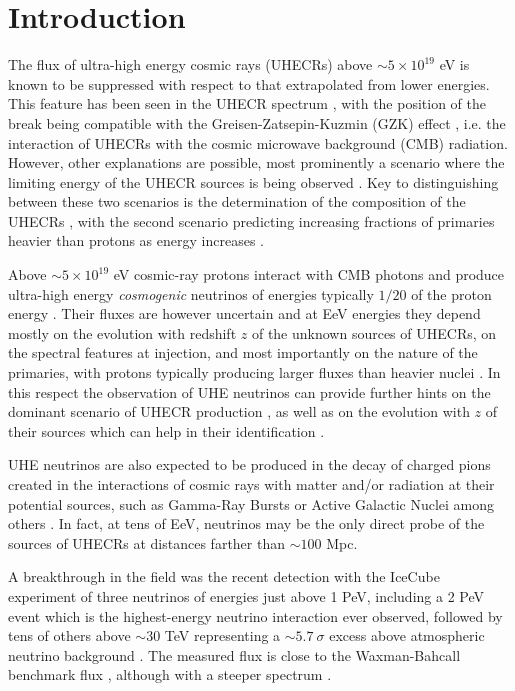\documentclass[reprint,showpacs,showkeys,amsmath,amssymb,aps,nofootinbib]{revtex4-1}
\begin{document}
\section{Introduction}
\def\linenumberfont{\normalfont\tiny\itshape\sffamily}
\linenumbers

The flux of ultra-high energy cosmic rays (UHECRs) above $\sim 5\times 10^{19}$ eV 
is known to be suppressed with respect to that extrapolated from lower energies. 
This feature has been seen in the UHECR spectrum \cite{HiRes_spectrum,Auger_spectrum},
with the position of the break being compatible with the Greisen-Zatsepin-Kuzmin (GZK) effect \cite{GZK},  
i.e. the interaction of UHECRs with the cosmic microwave background (CMB) radiation.
However, other explanations are possible, most prominently a scenario 
where the limiting energy of the UHECR sources is being observed \cite{Allard_2012}. 
Key to distinguishing between these two scenarios is the determination
of the composition of the UHECRs \cite{Auger_Xmax,TA_Xmax}, with the second scenario predicting
increasing fractions of primaries heavier than protons as energy increases \cite{Allard_2012}. 

Above $\sim 5\times 10^{19}$ eV cosmic-ray protons interact with CMB photons
and produce ultra-high energy {\it cosmogenic} neutrinos of energies 
typically $1/20$ of the proton energy \cite{BZ}. Their fluxes are however uncertain 
and at EeV energies they depend mostly on the evolution with redshift $z$ of
the unknown sources of UHECRs, on the spectral features at injection, and most 
importantly on the nature of the primaries, with protons 
typically producing larger fluxes than heavier nuclei \cite{Ave_GZK,Kotera_GZK}.
In this respect the observation of UHE neutrinos can provide further hints 
on the dominant scenario of UHECR production \cite{Kotera_GZK}, as well as on the evolution with $z$
of their sources which can help in their identification \cite{Stanev,Kotera_GZK}. 
 
UHE neutrinos are also expected to be produced 
in the decay of charged pions created in the interactions of cosmic rays with 
matter and/or radiation at their potential sources, 
such as Gamma-Ray Bursts or Active Galactic Nuclei 
among others \cite{Becker_PhysRep}. 
In fact, at tens of EeV, neutrinos may be the only direct probe 
of the sources of UHECRs at distances farther 
than $\sim 100$ Mpc.

A breakthrough in the field was the recent detection with the 
IceCube experiment of three neutrinos of energies just above 1 PeV, 
including a 2 PeV event which is the highest-energy neutrino 
interaction ever observed, followed by tens of others above $\sim 30$ TeV 
representing a $\sim5.7~\sigma$ excess
above atmospheric neutrino background \cite{IceCube_PRL14}. 
The measured flux is close to the Waxman-Bahcall benchmark flux \cite{WB},
although with a steeper spectrum \cite{IceCube_PRD15}.
\end{document}
